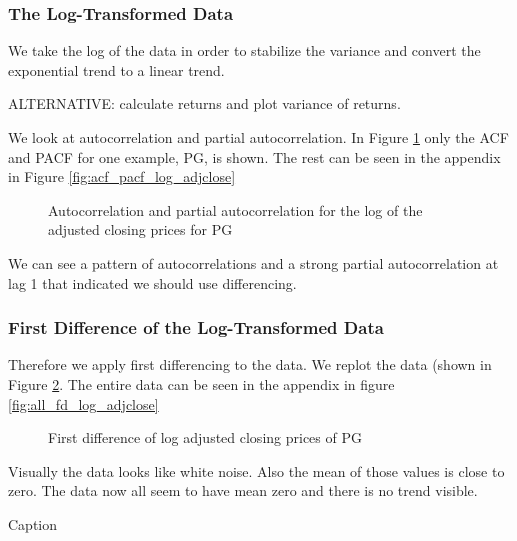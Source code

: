 \subsubsection*{The Log-Transformed Data}
We take the log of the data in order to stabilize the variance and convert the exponential trend to a linear trend. 

ALTERNATIVE: calculate returns and plot variance of returns. 

We look at autocorrelation and partial autocorrelation. In Figure \ref{fig:acf_pacf_log_adjclose_PG} only the ACF and PACF for one example, PG, is shown. The rest can be seen in the appendix in Figure \ref{fig:acf_pacf_log_adjclose}

\begin{figure}[h]
    \centering
    \begin{adjustbox}{width=.9\textwidth,center}
    
    \end{adjustbox}  
    \caption{Autocorrelation and partial autocorrelation for the log of the adjusted closing prices for PG}
    \label{fig:acf_pacf_log_adjclose_PG}
\end{figure}{}


We can see a pattern of autocorrelations and a strong partial autocorrelation at lag 1 that indicated we should use differencing. 

\subsubsection*{First Difference of the Log-Transformed Data}
Therefore we apply first differencing to the data. 
We replot the data (shown in Figure \ref{fig:PG_fd_log_adjclose}. The entire data can be seen in the appendix in figure \ref{fig:all_fd_log_adjclose}

\begin{figure}[H]
    \centering
    \begin{adjustbox}{width=.9\textwidth,center}
    
    \end{adjustbox}  
    \caption{First difference of log adjusted closing prices of PG}
    \label{fig:PG_fd_log_adjclose}
\end{figure}{}


Visually the data looks like white noise. Also the mean of those values is close to zero. The data now all seem to have mean zero and there is no trend visible. 
\begin{table}[h!]
    \centering
    \begin{tabular}{|c|c|}
    \hline
    
    \end{tabular}
    \caption{Caption}
    \label{tab:my_label}
\end{table}{}

